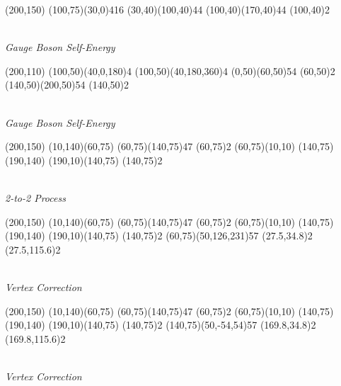 \documentclass{article}
\begin{document}
\begin{center}
	\begin{axopicture}(200,150)
		\GluonCirc(100,75)(30,0){4}{16}	
		\Gluon(30,40)(100,40){4}{4}
		\Gluon(100,40)(170,40){4}{4}
		\Vertex(100,40){2}
	\end{axopicture}
	\\{\sl Gauge Boson Self-Energy }
\end{center}


\begin{center}
	\begin{axopicture}(200,110)
		\DashArc(100,50)(40,0,180){4}
		\DashArc(100,50)(40,180,360){4}
		\Gluon(0,50)(60,50){5}{4}
		\Vertex(60,50){2} 
		\Gluon(140,50)(200,50){5}{4}
		\Vertex(140,50){2}
	\end{axopicture}
	\\{\sl Gauge Boson Self-Energy }
\end{center}

	
\begin{center}
	\begin{axopicture}(200,150)
		\Line[arrow](10,140)(60,75)
		\Photon(60,75)(140,75){4}{7}
		\Vertex(60,75){2}
		\Line[arrow](60,75)(10,10)
		\Line[arrow](140,75)(190,140)
		\Line[arrow](190,10)(140,75)
		\Vertex(140,75){2}
		\end{axopicture}
	\\ {\sl 2-to-2 Process}
\end{center}



\begin{center}
	\begin{axopicture}(200,150)
		\Line[arrow](10,140)(60,75)
		\Photon(60,75)(140,75){4}{7}
		\Vertex(60,75){2}
		\Line[arrow](60,75)(10,10)
		\Line[arrow](140,75)(190,140)
		\Line[arrow](190,10)(140,75)
		\Vertex(140,75){2}
		\PhotonArc(60,75)(50,126,231){5}{7}
		\Vertex(27.5,34.8){2}
		\Vertex(27.5,115.6){2}
	\end{axopicture}
	\\ {\sl Vertex Correction}
\end{center}

\begin{center}
	\begin{axopicture}(200,150)
		\Line[arrow](10,140)(60,75)
		\Photon(60,75)(140,75){4}{7}
		\Vertex(60,75){2}
		\Line[arrow](60,75)(10,10)
		\Line[arrow](140,75)(190,140)
		\Line[arrow](190,10)(140,75)
		\Vertex(140,75){2}
		\PhotonArc(140,75)(50,-54,54){5}{7}
		\Vertex(169.8,34.8){2}
		\Vertex(169.8,115.6){2}
	\end{axopicture}
	\\ {\sl Vertex Correction}
\end{center}
\end{document}

